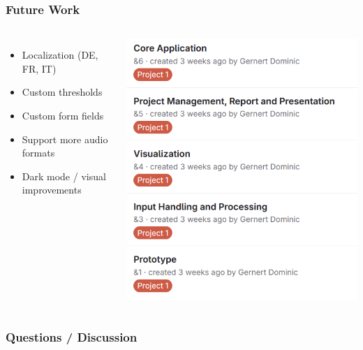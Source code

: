 \begin{frame}
    \frametitle{Future Work}
    \begin{columns}
        \begin{itemize}
            \large
            \item Localization (DE, FR, IT)
            \item Custom thresholds
            \item Custom form fields
            \item Support more audio formats
            \item Dark mode / visual improvements
        \end{itemize}
        \includegraphics[width=0.8\linewidth]{../assets/epics_interim_presentation.png}
    \end{columns}
\end{frame}

\begin{frame}
    \frametitle{Questions / Discussion}
\end{frame}
